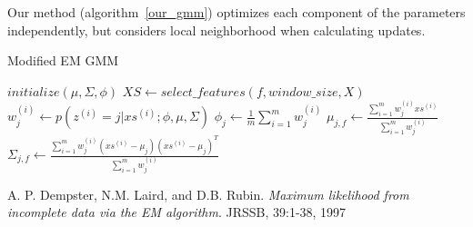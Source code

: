 \documentclass[10pt,a4paper]{article}
\begin{document}
Our method (algorithm~\ref{our_gmm}) optimizes each component of the parameters independently, but considers local neighborhood when calculating updates.
\begin{algorithm}
\caption{Modified EM GMM}
\label{our_gmm}
\begin{algorithmic}
\State $initialize(\mu, \Sigma, \phi)$
        \State $XS\gets select\_features(f, window\_size, X)$
            \State $w_j^{(i)}\gets p(z^{(i)} = j|xs^{(i)}; \phi, \mu, \Sigma)$
        \EndFor
        \State
        \State $\phi_{j}\gets\frac{1}{m}\sum_{i=1}^{m}w_j^{(i)}$
        \State $\mu_{j,f}\gets\frac{\sum_{i=1}^mw_j^{(i)}xs^{(i)}}{\sum_{i=1}^mw_j^{(i)}}$
        \State $\Sigma_{j,f}\gets\frac{\sum_{i=1}^mw_j^{(i)}(xs^{(i)}-\mu_j)(xs^{(i)}-\mu_j)^T}{\sum_{i=1}^mw_j^{(i)}}$
    \EndFor
\EndFor
\EndFunction
\end{algorithmic}
\end{algorithm}

\begin{thebibliography}{9}

  A. P. Dempster, N.M. Laird, and D.B. Rubin.
  \emph{Maximum likelihood from incomplete data via the EM algorithm}.
  JRSSB, 39:1-38,
  1997
\end{thebibliography}
\end{document}
